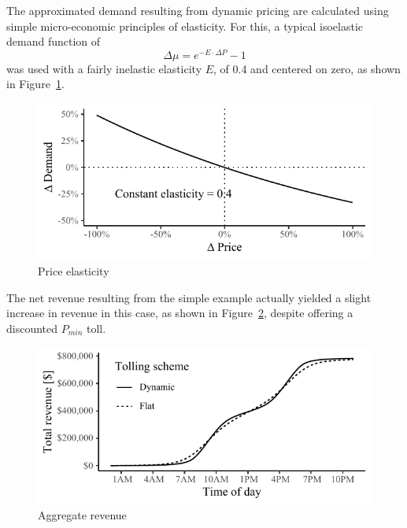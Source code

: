 \documentclass{article}
\begin{document}
The approximated demand resulting from dynamic pricing are calculated using simple micro-economic principles of elasticity. For this, a typical isoelastic demand function of
  \begin{equation}
 \Delta\mu = e^{-E \cdot \Delta P} - 1
 \end{equation} 
 was used with a fairly inelastic elasticity $E$, of 0.4 and centered on zero, as shown in Figure~\ref{fig:toyelasticity}.
  
  \begin{figure}[h]
 	\centering
 	\includegraphics[width=\linewidth]{figures/toyelasticity}
 	\caption{Price elasticity}
 	\label{fig:toyelasticity}
 \end{figure}
 
  
The net revenue resulting from the simple example actually yielded a slight increase in revenue in this case, as shown in Figure~\ref{fig:toyrevenue}, despite offering a discounted $P_{min}$ toll.
 
 \begin{figure}[h]
 	\centering
 	\includegraphics[width=\linewidth]{figures/toyrevenue}
 	\caption{Aggregate revenue}
 	\label{fig:toyrevenue}
 \end{figure}
 
\end{document}
